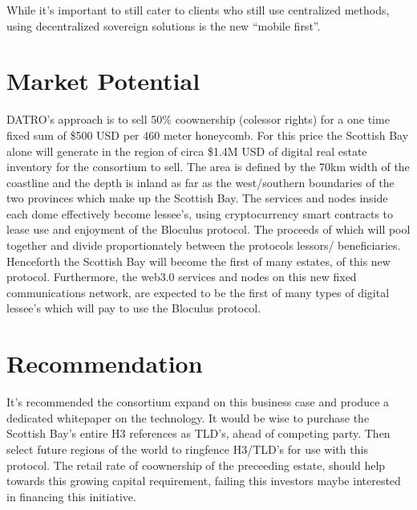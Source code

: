 \documentclass[letterpaper,10pt,openany,oneside,english]{sphinxmanual}
\begin{document}
\sphinxAtStartPar
While it’s important to still cater to clients who still use centralized methods, using decentralized sovereign solutions is the new “mobile first”.


\section{Market Potential}
\label{\detokenize{executivesummary:market-potential}}
\sphinxAtStartPar
DATRO’s approach is to sell 50\% co\sphinxhyphen{}ownership (co\sphinxhyphen{}lessor rights) for a one time fixed sum of \$500 USD per 460 meter honeycomb.
For this price the Scottish Bay alone will generate in the region of circa \$1.4M USD of digital real estate inventory for the consortium to sell.
The area is defined by the 70km width of the coastline and the depth is inland as far as the west/southern boundaries of the two provinces which make up the Scottish Bay.
The services and nodes inside each dome effectively become lessee’s, using cryptocurrency smart contracts to lease use and enjoyment of the Bloculus protocol.
The proceeds of which will pool together and divide proportionately between the protocols lessors/ beneficiaries.
Henceforth the Scottish Bay will become the first of many estates, of this new protocol.
Furthermore, the web3.0 services and nodes on this new fixed communications network, are expected to be the first of many types of digital lessee’s which will pay to use the Bloculus protocol.


\section{Recommendation}
\label{\detokenize{executivesummary:recommendation}}
\sphinxAtStartPar
It’s recommended the consortium expand on this business case and produce a dedicated whitepaper on the technology.
It would be wise to purchase the Scottish Bay’s entire H3 references as TLD’s, ahead of competing party.
Then select future regions of the world to ringfence H3/TLD’s for use with this protocol.
The retail rate of co\sphinxhyphen{}ownership of the preceeding estate, should help towards this growing capital requirement, failing this investors maybe interested in financing this initiative.
\end{document}
